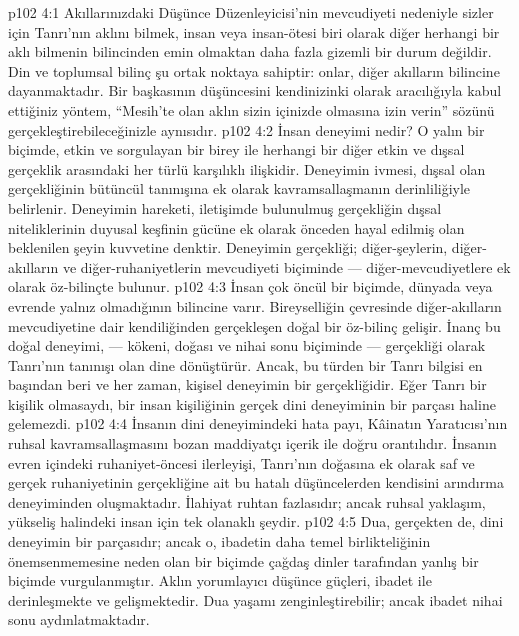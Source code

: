 \vs p102 4:1 Akıllarınızdaki Düşünce Düzenleyicisi’nin mevcudiyeti nedeniyle sizler için Tanrı’nın aklını bilmek, insan veya insan\hyp{}ötesi biri olarak diğer herhangi bir aklı bilmenin bilincinden emin olmaktan daha fazla gizemli bir durum değildir. Din ve toplumsal bilinç şu ortak noktaya sahiptir: onlar, diğer akılların bilincine dayanmaktadır. Bir başkasının düşüncesini kendinizinki olarak aracılığıyla kabul ettiğiniz yöntem, “Mesih’te olan aklın sizin içinizde olmasına izin verin” sözünü gerçekleştirebileceğinizle aynısıdır.
\vs p102 4:2 İnsan deneyimi nedir? O yalın bir biçimde, etkin ve sorgulayan bir birey ile herhangi bir diğer etkin ve dışsal gerçeklik arasındaki her türlü karşılıklı ilişkidir. Deneyimin ivmesi, dışsal olan gerçekliğinin bütüncül tanınışına ek olarak kavramsallaşmanın derinliliğiyle belirlenir. Deneyimin hareketi, iletişimde bulunulmuş gerçekliğin dışsal niteliklerinin duyusal keşfinin gücüne ek olarak önceden hayal edilmiş olan beklenilen şeyin kuvvetine denktir. Deneyimin gerçekliği; diğer\hyp{}şeylerin, diğer\hyp{}akılların ve diğer\hyp{}ruhaniyetlerin mevcudiyeti biçiminde --- diğer\hyp{}mevcudiyetlere ek olarak öz\hyp{}bilinçte bulunur.
\vs p102 4:3 İnsan çok öncül bir biçimde, dünyada veya evrende yalnız olmadığının bilincine varır. Bireyselliğin çevresinde diğer\hyp{}akılların mevcudiyetine dair kendiliğinden gerçekleşen doğal bir öz\hyp{}bilinç gelişir. İnanç bu doğal deneyimi, --- kökeni, doğası ve nihai sonu biçiminde --- gerçekliği olarak Tanrı’nın tanınışı olan dine dönüştürür. Ancak, bu türden bir Tanrı bilgisi en başından beri ve her zaman, kişisel deneyimin bir gerçekliğidir. Eğer Tanrı bir kişilik olmasaydı, bir insan kişiliğinin gerçek dini deneyiminin bir parçası haline gelemezdi.
\vs p102 4:4 İnsanın dini deneyimindeki hata payı, Kâinatın Yaratıcısı’nın ruhsal kavramsallaşmasını bozan maddiyatçı içerik ile doğru orantılıdır. İnsanın evren içindeki ruhaniyet\hyp{}öncesi ilerleyişi, Tanrı’nın doğasına ek olarak saf ve gerçek ruhaniyetinin gerçekliğine ait bu hatalı düşüncelerden kendisini arındırma deneyiminden oluşmaktadır. İlahiyat ruhtan fazlasıdır; ancak ruhsal yaklaşım, yükseliş halindeki insan için tek olanaklı şeydir.
\vs p102 4:5 Dua, gerçekten de, dini deneyimin bir parçasıdır; ancak o, ibadetin daha temel birlikteliğinin önemsenmemesine neden olan bir biçimde çağdaş dinler tarafından yanlış bir biçimde vurgulanmıştır. Aklın yorumlayıcı düşünce güçleri, ibadet ile derinleşmekte ve gelişmektedir. Dua yaşamı zenginleştirebilir; ancak ibadet nihai sonu aydınlatmaktadır.
